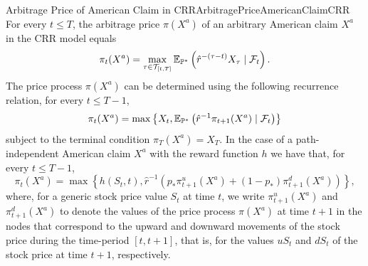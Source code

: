 \begin{prop}{Arbitrage Price of American Claim in CRR}{ArbitragePriceAmericanClaimCRR}
	For every \(t \le T\), the arbitrage price \(\pi(X^a)\) of an arbitrary American claim \(X^a\) in the CRR model equals
	\begin{equation} \label{eq:GeneralAmericanArbitragePrice}
		\pi_t(X^a) = \max_{\tau \in \mathcal{T}_{[t,T]}} \mathbb{E}_{\mathbb{P}^*} \left( \hat{r}^{-(\tau-t)} X_\tau \mid \mathcal{F}_t \right).
	\end{equation}
	The price process \(\pi(X^a)\) can be determined using the following recurrence relation, for every \(t \le T - 1\),
	\begin{equation} \label{eq:SnellEnvelopeRecurrence}
		\pi_t(X^a) = \max \left\{ X_t, \mathbb{E}_{\mathbb{P}^*} \left( \hat{r}^{-1} \pi_{t+1}(X^a) \mid \mathcal{F}_t \right) \right\}
	\end{equation}
	subject to the terminal condition \(\pi_T(X^a) = X_T\). In the case of a path-independent American claim \(X^a\) with the reward function \(h\) we have that, for every \(t \le T - 1\),
	\begin{equation} \label{eq:PathIndependentRecurrence}
		\pi_t(X^a) = \max \left\{ h(S_t, t), \hat{r}^{-1} \left( p_* \pi_{t+1}^u(X^a) + (1 - p_*) \pi_{t+1}^d(X^a) \right) \right\},
	\end{equation}
	where, for a generic stock price value \(S_t\) at time \(t\), we write \(\pi_{t+1}^u(X^a)\) and \(\pi_{t+1}^d(X^a)\) to denote the values of the price process \(\pi(X^a)\) at time \(t + 1\) in the nodes that correspond to the upward and downward movements of the stock price during the time-period \([t, t + 1]\), that is, for the values \(uS_t\) and \(dS_t\) of the stock price at time \(t + 1\), respectively.
\end{prop}
